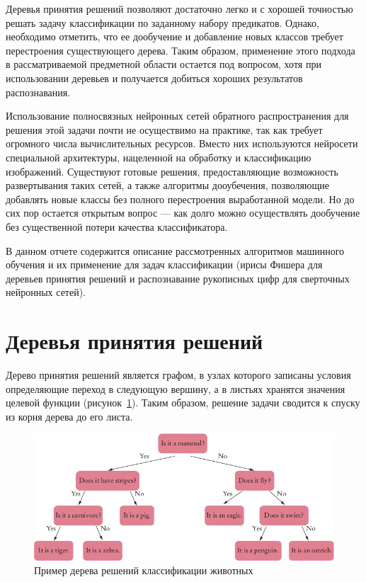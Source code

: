 \documentclass[a4paper,14pt]{extarticle} %
\begin{document}
Деревья принятия решений позволяют достаточно легко и с хорошей точностью решать задачу классификации по заданному набору предикатов. Однако, необходимо отметить, что ее дообучение и добавление новых классов требует перестроения существующего дерева. Таким образом, применение этого подхода в рассматриваемой предметной области остается под вопросом, хотя при использовании деревьев и получается добиться хороших результатов распознавания.

Использование полносвязных нейронных сетей обратного распространения для решения этой задачи почти не осуществимо на практике, так как требует огромного числа вычислительных ресурсов. Вместо них используются нейросети специальной архитектуры, нацеленной на обработку и классификацию изображений. Существуют готовые решения, предоставляющие возможность развертывания таких сетей, а также алгоритмы дооубечения, позволяющие добавлять новые классы без полного перестроения выработанной модели. Но до сих пор остается открытым вопрос --- как долго можно осуществлять дообучение без существенной потери качества классификатора.

В данном отчете содержится описание рассмотренных алгоритмов машинного обучения и их применение для задач классификации (ирисы Фишера для деревьев принятия решений и распознавание рукописных цифр для сверточных нейронных сетей).

\newpage
\renewcommand{\contentsname}{\centering Разделы}
\tableofcontents
\newpage

\section{Деревья принятия решений} 
\hspace{\parindent} Дерево принятия решений является графом, в узлах которого записаны условия определяющие переход в следующую вершину, а в листьях хранятся значения целевой функции (рисунок~\ref{fig:decision-tree}). Таким образом, решение задачи сводится к спуску из корня дерева до его листа.

\begin{figure}[H]
\centering
\includegraphics[width=0.8\linewidth]{decision-tree.jpg}
\caption{Пример дерева решений классификации животных}
\label{fig:decision-tree}
\end{figure}
\end{document}
